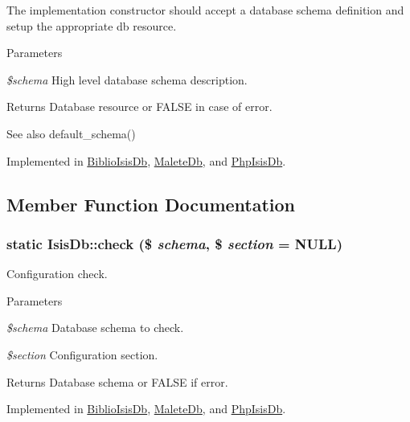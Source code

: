 The implementation constructor should accept a database schema definition and setup the appropriate db resource.


\begin{DoxyParams}{Parameters}
\item[{\em \$schema}]High level database schema description.\end{DoxyParams}
\begin{DoxyReturn}{Returns}
Database resource or FALSE in case of error.
\end{DoxyReturn}
\begin{DoxySeeAlso}{See also}
default\_\-schema() 
\end{DoxySeeAlso}


Implemented in \hyperlink{classBiblioIsisDb_ab2c5ec782b324847e104d8ad35a230af}{BiblioIsisDb}, \hyperlink{classMaleteDb_a60f87371bc1ec156b010e5b38b4c22e2}{MaleteDb}, and \hyperlink{classPhpIsisDb_abb6db51373d065baf9135fd278653bc5}{PhpIsisDb}.



\subsection{Member Function Documentation}
\hypertarget{interfaceIsisDb_af681b8f990b579f1835aa7ba4c83f1b8}{
\subsubsection[{check}]{\setlength{\rightskip}{0pt plus 5cm}static IsisDb::check (\$ {\em schema}, \/  \$ {\em section} = {\ttfamily NULL})}}
\label{interfaceIsisDb_af681b8f990b579f1835aa7ba4c83f1b8}
Configuration check.


\begin{DoxyParams}{Parameters}
\item[{\em \$schema}]Database schema to check.\item[{\em \$section}]Configuration section.\end{DoxyParams}
\begin{DoxyReturn}{Returns}
Database schema or FALSE if error. 
\end{DoxyReturn}


Implemented in \hyperlink{classBiblioIsisDb_a929467f1907d3aeaeebe493f0c188c5b}{BiblioIsisDb}, \hyperlink{classMaleteDb_ab2da32d84af17df79d947ae32257b4ec}{MaleteDb}, and \hyperlink{classPhpIsisDb_a23761cc04114090a2863467b2accc80a}{PhpIsisDb}.


